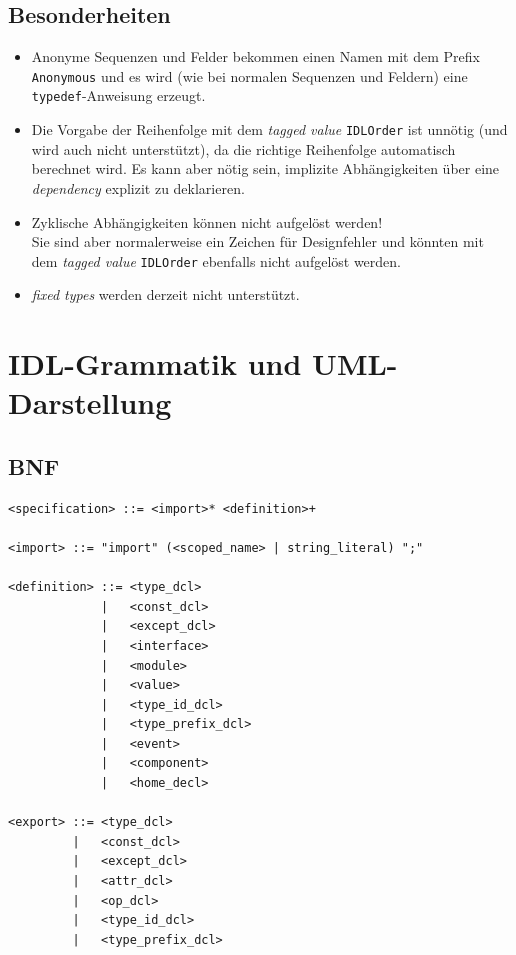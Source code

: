 \documentclass [a4paper,10pt] {scrartcl}
\begin{document}
\subsection{Besonderheiten}
\begin{itemize}
\item Anonyme Sequenzen und Felder bekommen einen Namen mit dem Prefix \texttt{Anonymous}
    und es wird (wie bei normalen Sequenzen und Feldern) eine \texttt{typedef}-Anweisung erzeugt.
\item Die Vorgabe der Reihenfolge mit dem \emph{tagged value} \texttt{IDLOrder} ist
    unn{\"o}tig (und wird auch nicht unterst{\"u}tzt), da die richtige Reihenfolge
    automatisch berechnet wird. Es kann aber n{\"o}tig sein, implizite Abh{\"a}ngigkeiten
    {\"u}ber eine \emph{dependency} explizit zu deklarieren.
\item Zyklische Abh{\"a}ngigkeiten k{\"o}nnen nicht aufgel{\"o}st werden!\\
    Sie sind aber normalerweise ein Zeichen f{\"u}r Designfehler und k{\"o}nnten
    mit dem \emph{tagged value} \texttt{IDLOrder} ebenfalls nicht aufgel{\"o}st werden.
\item \emph{fixed types} werden derzeit nicht unterst{\"u}tzt.
\end{itemize}


\cleardoublepage
\section{IDL-Grammatik und UML-Darstellung}
\label{sec:BNF}
\subsection{BNF}
\begin{verbatim}
<specification> ::= <import>* <definition>+

<import> ::= "import" (<scoped_name> | string_literal) ";"

<definition> ::= <type_dcl>
             |   <const_dcl>
             |   <except_dcl>
             |   <interface>
             |   <module>
             |   <value>
             |   <type_id_dcl>
             |   <type_prefix_dcl>
             |   <event>
             |   <component>
             |   <home_decl>

<export> ::= <type_dcl>
         |   <const_dcl>
         |   <except_dcl>
         |   <attr_dcl>
         |   <op_dcl>
         |   <type_id_dcl>
         |   <type_prefix_dcl>
\end{verbatim}
\end{document}
